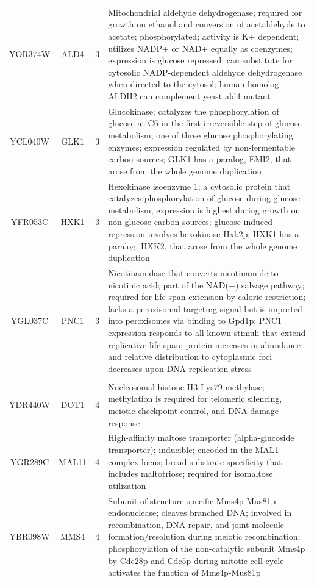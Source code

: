 \documentclass[]{article}
\begin{document}
\begin{longtable}{@{\extracolsep{3pt}} cccp{85mm}}
YOR374W & ALD4 & 3 & Mitochondrial aldehyde dehydrogenase; required for growth on ethanol and conversion of acetaldehyde to acetate; phosphorylated; activity is K+ dependent; utilizes NADP+ or NAD+ equally as coenzymes; expression is glucose repressed; can substitute for cytosolic NADP-dependent aldehyde dehydrogenase when directed to the cytosol; human homolog ALDH2 can complement yeast ald4 mutant \\ 
YCL040W & GLK1 & 3 & Glucokinase; catalyzes the phosphorylation of glucose at C6 in the first irreversible step of glucose metabolism; one of three glucose phosphorylating enzymes; expression regulated by non-fermentable carbon sources; GLK1 has a paralog, EMI2, that arose from the whole genome duplication \\ 
YFR053C & HXK1 & 3 & Hexokinase isoenzyme 1; a cytosolic protein that catalyzes phosphorylation of glucose during glucose metabolism; expression is highest during growth on non-glucose carbon sources; glucose-induced repression involves hexokinase Hxk2p; HXK1 has a paralog, HXK2, that arose from the whole genome duplication \\ 
YGL037C & PNC1 & 3 & Nicotinamidase that converts nicotinamide to nicotinic acid; part of the NAD(+) salvage pathway; required for life span extension by calorie restriction; lacks a peroxisomal targeting signal but is imported into peroxisomes via binding to Gpd1p; PNC1 expression responds to all known stimuli that extend replicative life span; protein increases in abundance and relative distribution to cytoplasmic foci decreases upon DNA replication stress \\   \hline \\ [-1.8ex] 
YDR440W & DOT1 & 4 & Nucleosomal histone H3-Lys79 methylase; methylation is required for telomeric silencing, meiotic checkpoint control, and DNA damage response \\ 
YGR289C & MAL11 & 4 & High-affinity maltose transporter (alpha-glucoside transporter); inducible; encoded in the MAL1 complex locus; broad substrate specificity that includes maltotriose; required for isomaltose utilization \\ 
YBR098W & MMS4 & 4 & Subunit of structure-specific Mms4p-Mus81p endonuclease; cleaves branched DNA; involved in recombination, DNA repair, and joint molecule formation/resolution during meiotic recombination; phosphorylation of the non-catalytic subunit Mms4p by Cdc28p and Cdc5p during mitotic cell cycle activates the function of Mms4p-Mus81p \\ 

\end{longtable}
\end{document}
